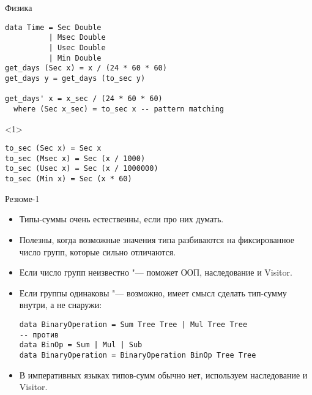 \begin{frame}[t,fragile]{Физика}
\begin{verbatim}
data Time = Sec Double
          | Msec Double
          | Usec Double
          | Min Double
get_days (Sec x) = x / (24 * 60 * 60)
get_days y = get_days (to_sec y)

get_days' x = x_sec / (24 * 60 * 60)
  where (Sec x_sec) = to_sec x -- pattern matching
\end{verbatim}
\begin{onlyenv}<1>
\begin{verbatim}
to_sec (Sec x) = Sec x
to_sec (Msec x) = Sec (x / 1000)
to_sec (Usec x) = Sec (x / 1000000)
to_sec (Min x) = Sec (x * 60)
\end{verbatim}
\end{onlyenv}
\end{frame}

\begin{frame}[fragile]{Резюме-1}
	\begin{itemize}
		\item Типы-суммы очень естественны, если про них думать.
		\item Полезны, когда возможные значения типа разбиваются на фиксированное число групп, которые сильно отличаются.
		\item Если число групп неизвестно "--- поможет ООП, наследование и Visitor.
		\item Если группы одинаковы "--- возможно, имеет смысл сделать тип-сумму внутри, а не снаружи:
\begin{verbatim}
data BinaryOperation = Sum Tree Tree | Mul Tree Tree
-- против
data BinOp = Sum | Mul | Sub
data BinaryOperation = BinaryOperation BinOp Tree Tree
\end{verbatim}
		\item В императивных языках типов-сумм обычно нет, используем наследование и Visitor.
	\end{itemize}
\end{frame}

